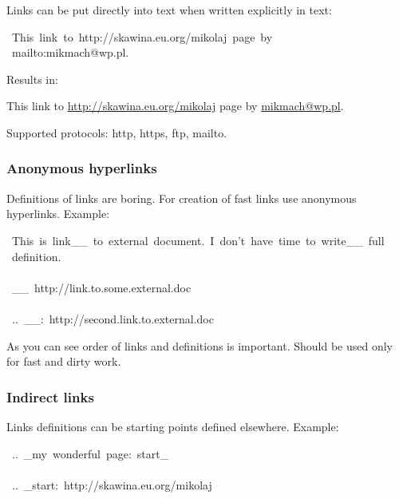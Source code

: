 \documentclass[12pt]{article}
\begin{document}
Links can be put directly into text when written explicitly in text:

\begin{ttfamily}\begin{flushleft}
\mbox{~This~link~to~http://skawina.eu.org/mikolaj~page~by}\\
\mbox{~mailto:mikmach@wp.pl.}\\
\end{flushleft}\end{ttfamily}

Results in:

This link to \href{http://skawina.eu.org/mikolaj}{http://skawina.eu.org/mikolaj} page by \href{mailto:mikmach@wp.pl}{mikmach@wp.pl}.

Supported protocols: http, https, ftp, mailto.

\hypertarget{lanonymous-hyperlinks}{}
\subsubsection{Anonymous hyperlinks}

Definitions of links are boring. For creation of fast links use anonymous
hyperlinks. Example:

\begin{ttfamily}\begin{flushleft}
\mbox{~This~is~link\_\_~to~external~document.~I~don't~have~time~to~write\_\_~full}\\
\mbox{~definition.}\\
\mbox{}\\
\mbox{~\_\_~http://link.to.some.external.doc}\\
\mbox{}\\
\mbox{~..~\_\_:~http://second.link.to.external.doc}\\
\end{flushleft}\end{ttfamily}

As you can see order of links and definitions is important. Should be used
only for fast and dirty work.

\hypertarget{lindirect-links}{}
\subsubsection{Indirect links}

Links definitions can be starting points defined elsewhere. Example:

\begin{ttfamily}\begin{flushleft}
\mbox{~..~\_my~wonderful~page:~start\_}\\
\mbox{}\\
\mbox{~..~\_start:~http://skawina.eu.org/mikolaj}\\
\end{flushleft}\end{ttfamily}
\end{document}
